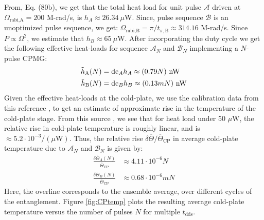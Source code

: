From, Eq. (80b), we get that the total heat load for unit pulse $\mathcal{A}$ driven at $\Omega_{\text{rabi,A}}=200$ M-rad/s, is $h_{A}\approx26.34~\mu$W. Since, pulse sequence $\mathcal{B}$ is an unoptimized pulse sequence, we get: $\Omega_{\text{rabi,B}}=\pi/t_{\pi,\text{B}}\approx 314.16$ M-rad/s. Since $P\propto\Omega^{2}$, we estimate that $h_{B}\approx65~\mu$W. After incorporating the duty cycle we get the following effective heat-loads for sequence $\mathcal{A}_{N}$ and $\mathcal{B}_{N}$ implementing a $N$-pulse CPMG:
\begin{subequations}
    \begin{align}
        \Tilde{h}_{\text{A}}(N) &= \text{dc}_{A}h_{A} \approx (0.79 N)~\text{nW}\\
        \Tilde{h}_{\text{B}}(N) &= \text{dc}_{B}h_{B} \approx (0.13 mN)~\text{nW}
    \end{align}
\end{subequations}
Given the effective heat-loads at the cold-plate, we use the calibration data from this reference \cite{krinner2019engineering}, to get an estimate of approximate rise in the temperature of the cold-plate stage. From this source \cite{krinner2019engineering}, we see that for heat load under 50 $\mu$W, the relative rise in cold-plate temperature is roughly linear, and is $\approx5.2\cdot10^{-3}/(\mu\text{W})$. Thus, the relative rise $\delta \overline{\Theta}/\overline{\Theta}_{\text{CP}}$ in average cold-plate temperature due to $\mathcal{A}_{N}$ and $\mathcal{B}_{N}$ is given by:
\begin{subequations}
    \begin{align}
        \frac{\delta \overline{\Theta}_{A}(N)} {\overline{\Theta}_{\text{CP}}} &\approx 4.11\cdot10^{-6} N\\
          \frac{\delta \overline{\Theta} _{B}(N)} {\overline{\Theta}_{\text{CP}}} &\approx 0.68\cdot10^{-6} m
        N
    \end{align}
\end{subequations}
Here, the overline corresponds to the ensemble average, over different cycles of the entanglement. Figure \ref{fig:CPtemp} plots the resulting average cold-plate temperature versus the number of pulses $N$ for multiple $t_{\text{dds}}$.

